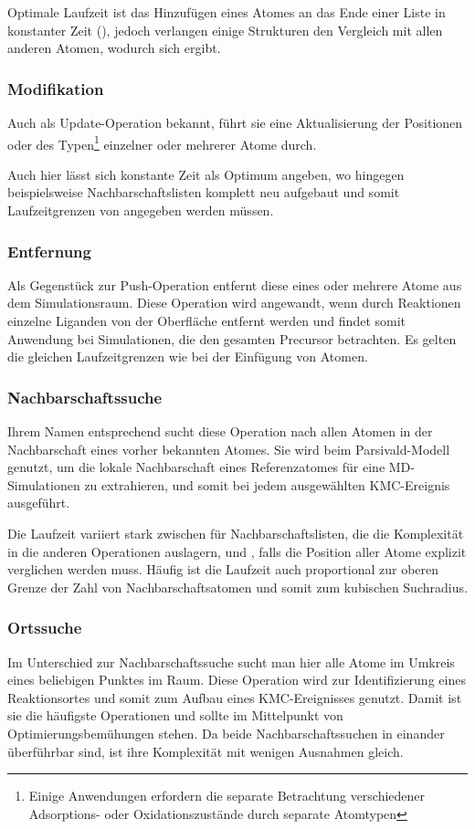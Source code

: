 Optimale Laufzeit ist das Hinzufügen eines Atomes an das Ende einer Liste in konstanter Zeit (), jedoch verlangen einige Strukturen den Vergleich mit allen anderen Atomen, wodurch sich  ergibt.

\subsubsection{Modifikation}
Auch als Up\-date-Operation bekannt, führt sie eine Aktualisierung der Positionen oder des Typen\footnote{Einige Anwendungen erfordern die separate Betrachtung verschiedener Adsorptions- oder Oxidationszustände durch separate Atomtypen} einzelner oder mehrerer Atome durch.

Auch hier lässt sich konstante Zeit als Optimum angeben, wo hingegen beispielsweise Nachbarschaftslisten komplett neu aufgebaut und somit Laufzeitgrenzen von  angegeben werden müssen.

\subsubsection{Entfernung}
Als Gegenstück zur Push-Operation entfernt diese eines oder mehrere Atome aus dem Simulationsraum.
Diese Operation wird angewandt, wenn durch Reaktionen einzelne Liganden von der Oberfläche entfernt werden und findet somit Anwendung bei Simulationen, die den gesamten Precursor betrachten.
Es gelten die gleichen Laufzeitgrenzen wie bei der Einfügung von Atomen.

\subsubsection{Nachbarschaftssuche}
Ihrem Namen entsprechend sucht diese Operation nach allen Atomen in der Nachbarschaft eines vorher bekannten Atomes.
Sie wird beim Parsivald-Modell genutzt, um die lokale Nachbarschaft eines Referenzatomes für eine MD-Simulationen zu extrahieren, und somit bei jedem ausgewählten KMC-Ereignis ausgeführt.

Die Laufzeit variiert stark zwischen  für Nachbarschaftslisten, die die Komplexität in die anderen Operationen auslagern, und , falls die Position aller Atome explizit verglichen werden muss.
Häufig ist die Laufzeit auch proportional zur oberen Grenze der Zahl von Nachbarschaftsatomen und somit zum kubischen Suchradius.

\subsubsection{Ortssuche}
Im Unterschied zur Nachbarschaftssuche sucht man hier alle Atome im Umkreis eines beliebigen Punktes im Raum.
Diese Operation wird zur Identifizierung eines Reaktionsortes und somit zum Aufbau eines KMC-Ereignisses genutzt.
Damit ist sie die häufigste Operationen und sollte im Mittelpunkt von Optimierungsbemühungen stehen.
Da beide Nachbarschaftssuchen in einander überführbar sind, ist ihre Komplexität mit wenigen Ausnahmen gleich.

